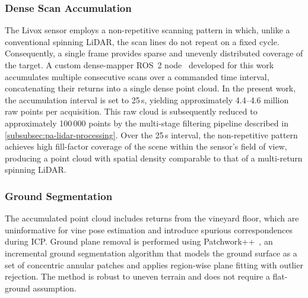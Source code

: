 \subsubsection{Dense Scan Accumulation}
\label{subsubsec:pa-dense-accumulation}

The Livox sensor employs a non-repetitive scanning pattern in which, unlike a conventional spinning LiDAR, the scan lines do not repeat on a fixed cycle. Consequently, a single frame provides sparse and unevenly distributed coverage of the target. A custom dense-mapper ROS~2 node~\cite{macenskiRobotOperatingSystem2022} developed for this work accumulates multiple consecutive scans over a commanded time interval, concatenating their returns into a single dense point cloud. In the present work, the accumulation interval is set to 25\,s, yielding approximately 4.4--4.6 million raw points per acquisition. This raw cloud is subsequently reduced to approximately 100\,000 points by the multi-stage filtering pipeline described in \cref{subsubsec:pa-lidar-processing}. Over the 25\,s interval, the non-repetitive pattern achieves high fill-factor coverage of the scene within the sensor's field of view, producing a point cloud with spatial density comparable to that of a multi-return spinning LiDAR.

\subsubsection{Ground Segmentation}
\label{subsubsec:pa-ground-segmentation}

The accumulated point cloud includes returns from the vineyard floor, which are uninformative for vine pose estimation and introduce spurious correspondences during ICP. Ground plane removal is performed using Patchwork++~\cite{leePatchworkFastRobust2022},
an incremental ground segmentation algorithm that models the ground surface as a set of concentric annular patches and applies region-wise plane fitting with outlier rejection. The method is robust to uneven terrain and does not require a flat-ground assumption.

